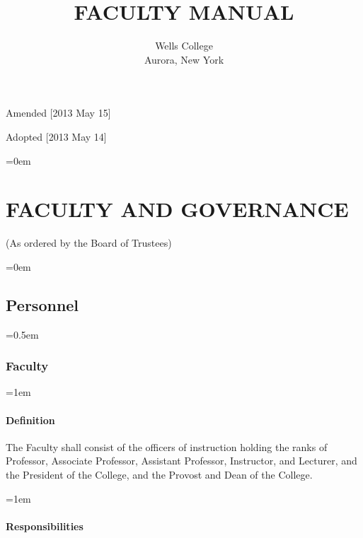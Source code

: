 \documentclass{manual}
\let\stdsection\section %
\renewcommand\section{\newpage\stdsection}
\let\oldsection\section
\renewcommand\section{\leftskip=0em\oldsection}
\let\oldsubsection\subsection
\renewcommand\subsection{\leftskip=0em\oldsubsection}
\let\oldsubsubsection\subsubsection
\renewcommand\subsubsection{\leftskip=0.5em\oldsubsubsection}
\let\oldparagraph\paragraph
\renewcommand\paragraph{\leftskip=1em\oldparagraph}
\begin{document}
\title{FACULTY MANUAL}

\author{Wells College\\Aurora, New York}

\maketitle
  \vfill
  \begin{center}
  Amended [2013 May 15]
  
  Adopted [2013 May 14]
  \end{center}

\newpage
\pagestyle{fancy}
\fancyhead[R]{\thepage \addtocounter{articlePage}{1}}

\tableofcontents

\newpage
\fancyfoot[C]{\thesection-\thearticlePage}

\section{FACULTY AND GOVERNANCE}\label{art:FacultyAndGovernance}
		\begin{center}(As ordered by the Board of Trustees)\end{center}

	\subsection{Personnel}\label{sec:Personnel}

		\subsubsection{Faculty}\label{sub:Faculty}

			\paragraph{Definition}
			The Faculty shall consist of the officers of instruction holding the ranks of Professor, Associate Professor, Assistant Professor, Instructor, and Lecturer, and the President of the College, and the Provost and Dean of the College.

			\paragraph{Responsibilities}\label{sub:Responsibilities}
\end{document}
